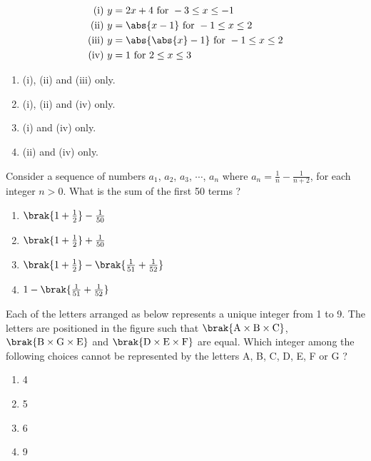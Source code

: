 \begin{figure}[!ht]
\centering
\resizebox{0.4\textwidth}{!}{%

}%
\end{figure}
\begin{align*}
\text{(i)}\ y & = 2x + 4\ \text{for}\ -3 \leq x \leq -1 \\
\text{(ii)}\ y & = \abs{x - 1}\ \text{for}\ -1 \leq x \leq 2 \\
\text{(iii)}\ y & = \abs{\abs{x} - 1}\ \text{for}\ -1 \leq x \leq 2 \\
\text{(iv)}\ y & = 1\ \text{for}\ 2 \leq x \leq 3 \\
\end{align*}
\begin{enumerate}
   \item (i), (ii) and (iii) only.
   \item (i), (ii) and (iv) only.
   \item (i) and (iv) only.
   \item (ii) and (iv) only. \\
\end{enumerate}
\item Consider a sequence of numbers $a_1$, $a_2$, $a_3$, $\cdots$, $a_n$ where $a_n = \frac{1}{n} - \frac{1}{n+2}$, for each integer $n > 0$. What is the sum of the first 50 terms ?
\begin{enumerate}
    \item $\brak{1 + \frac{1}{2}} - \frac{1}{50}$
    \item $\brak{1 + \frac{1}{2}} + \frac{1}{50}$
    \item $\brak{1 + \frac{1}{2}} - \brak{\frac{1}{51} + \frac{1}{52}}$
    \item $1 - \brak{\frac{1}{51} + \frac{1}{52}}$ \\
\end{enumerate}
\item Each of the letters arranged as below represents a unique integer from 1 to 9. The letters are positioned in the figure such that $\brak{\text{A} \times \text{B} \times \text{C}}$, $\brak{\text{B} \times \text{G} \times \text{E}}$ and $\brak{\text{D} \times \text{E} \times \text{F}}$ are equal. Which integer among the following choices cannot be represented by the letters A, B, C, D, E, F or G ?
\begin{figure}[!ht]
\centering
\resizebox{0.3\textwidth}{!}{%

}%
\end{figure}
\begin{enumerate}
    \item 4
    \item 5
    \item 6
    \item 9 \\
\end{enumerate}
